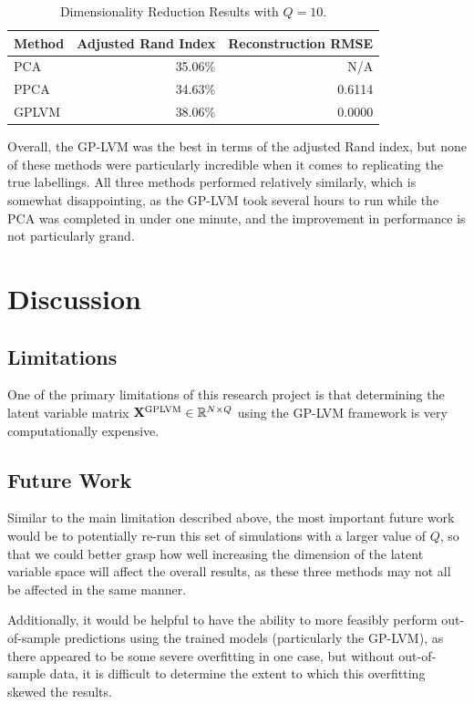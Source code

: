 \documentclass[12pt]{article}
\numberwithin{equation}{section}
\numberwithin{figure}{section}
\numberwithin{table}{section}
\begin{document}
\begin{table}[]
    \centering
    \begin{tabular}{@{}lrr@{}}
        \toprule
        Method & Adjusted Rand Index & Reconstruction RMSE \\ \midrule
        PCA    & 35.06\%             & N/A                 \\
        PPCA   & 34.63\%             & 0.6114              \\ 
        GPLVM  & 38.06\%             & 0.0000              \\ \bottomrule
    \end{tabular}
    \caption{Dimensionality Reduction Results with $Q = 10$.}
    \label{tab:dim-reduce-results}
\end{table}

Overall, the GP-LVM was the best in terms of the adjusted Rand index, but none of these methods were particularly incredible when it comes to replicating the true labellings. All three methods performed relatively similarly, which is somewhat disappointing, as the GP-LVM took several hours to run while the PCA was completed in under one minute, and the improvement in performance is not particularly grand. 

\section{Discussion}\label{sec:discussion}

\subsection{Limitations}

One of the primary limitations of this research project is that determining the latent variable matrix $\mathbf{X}^{\text{GPLVM}} \in \mathbb{R}^{N \times Q}$ using the GP-LVM framework is very computationally expensive.

\subsection{Future Work}

Similar to the main limitation described above, the most important future work would be to potentially re-run this set of simulations with a larger value of $Q$, so that we could better grasp how well increasing the dimension of the latent variable space will affect the overall results, as these three methods may not all be affected in the same manner. 

Additionally, it would be helpful to have the ability to more feasibly perform out-of-sample predictions using the trained models (particularly the GP-LVM), as there appeared to be some severe overfitting in one case, but without out-of-sample data, it is difficult to determine the extent to which this overfitting skewed the results.

\clearpage


\end{document}
